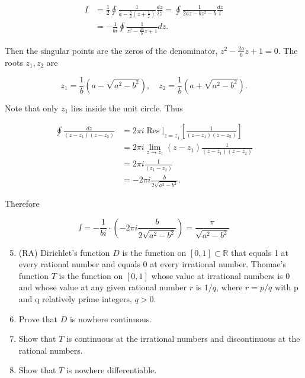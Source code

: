 \documentclass[10pt]{article}
\begin{document}
$$
\begin{aligned}
I & =\frac{1}{2} \oint \frac{1}{a-\frac{b}{2}\left(z+\frac{1}{z}\right)} \frac{d z}{i z}=\oint \frac{1}{2 a z-b z^{2}-b} \frac{d z}{i} \\
& =-\frac{1}{b i} \oint \frac{1}{z^{2}-\frac{2 a}{b} z+1} d z .
\end{aligned}
$$

Then the singular points are the zeros of the denominator, $z^{2}-\frac{2 a}{b} z+1=0$. The roots $z_{1}, z_{2}$ are

$$
z_{1}=\frac{1}{b}\left(a-\sqrt{a^{2}-b^{2}}\right), \quad z_{2}=\frac{1}{b}\left(a+\sqrt{a^{2}-b^{2}}\right) .
$$

Note that only $z_{1}$ lies inside the unit circle. Thus

$$
\begin{aligned}
\oint \frac{d z}{\left(z-z_{1}\right)\left(z-z_{2}\right)} & =\left.2 \pi i \operatorname{Res}\right|_{z=z_{1}}\left[\frac{1}{\left(z-z_{1}\right)\left(z-z_{2}\right)}\right] \\
& =2 \pi i \lim _{z \rightarrow z_{1}}\left(z-z_{1}\right) \frac{1}{\left(z-z_{1}\right)\left(z-z_{2}\right)} \\
& =2 \pi i \frac{1}{\left(z_{1}-z_{2}\right)} \\
& =-2 \pi i \frac{b}{2 \sqrt{a^{2}-b^{2}}} .
\end{aligned}
$$

Therefore

$$
I=-\frac{1}{b i} \cdot\left(-2 \pi i \frac{b}{2 \sqrt{a^{2}-b^{2}}}\right)=\frac{\pi}{\sqrt{a^{2}-b^{2}}}
$$

\begin{enumerate}
  \setcounter{enumi}{4}
  \item (RA) Dirichlet's function $D$ is the function on $[0,1] \subset \mathbb{R}$ that equals 1 at every rational number and equals 0 at every irrational number. Thomae's function $T$ is the function on $[0,1]$ whose value at irrational numbers is 0 and whose value at any given rational number $r$ is $1 / q$, where $r=p / q$ with $\mathrm{p}$ and q relatively prime integers, $q>0$.

  \item Prove that $D$ is nowhere continuous.

  \item Show that $T$ is continuous at the irrational numbers and discontinuous at the rational numbers.

  \item Show that $T$ is nowhere differentiable.

\end{enumerate}
\end{document}
